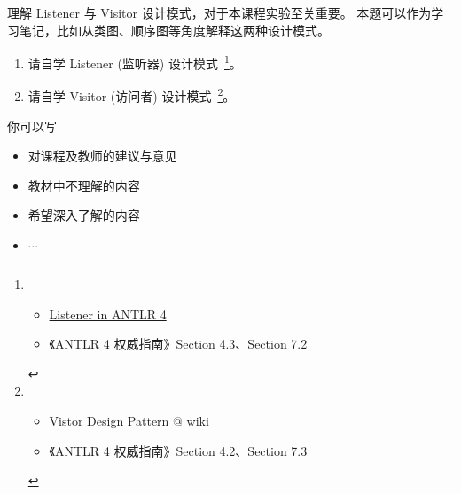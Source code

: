 \documentclass[a4paper, justified]{tufte-handout}
\begin{document}

\begin{problem}
  理解 Listener 与 Visitor 设计模式，对于本课程实验至关重要。
  本题可以作为学习笔记，比如从类图、顺序图等角度解释这两种设计模式。
  \begin{enumerate}[(1)]
    \item 请自学 Listener (监听器) 设计模式~\footnote[]{
      \begin{itemize}
        \item \href{https://github.com/antlr/antlr4/blob/master/doc/listeners.md}{Listener in ANTLR 4}
        \item 《ANTLR 4 权威指南》Section 4.3、Section 7.2
      \end{itemize}
    }。
    \item 请自学 Visitor (访问者) 设计模式~\footnote{
      \begin{itemize}
        \item \href{https://en.wikipedia.org/wiki/Visitor_pattern}{Vistor Design Pattern @ wiki}
        \item 《ANTLR 4 权威指南》Section 4.2、Section 7.3
      \end{itemize}
    }。
  \end{enumerate}
\end{problem}



\beginfb

你可以写
\begin{itemize}
  \item 对课程及教师的建议与意见
  \item 教材中不理解的内容
  \item 希望深入了解的内容
  \item $\cdots$
\end{itemize}
\end{document}
